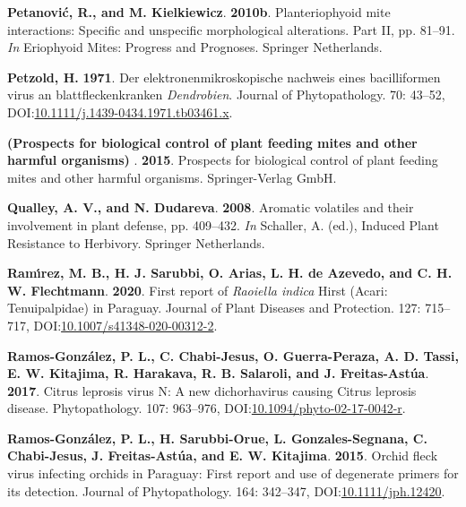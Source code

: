 \documentclass[12pt,final,CPage]{ufthesis}
\newlength{\cslhangindent}
\newenvironment{CSLReferences}[2] %
{%
	\setlength{\parindent}{0pt}
	\ifodd #1 \everypar{\setlength{\hangindent}{\cslhangindent}}\ignorespaces\fi
	\ifnum #2 > 0
	\setlength{\parskip}{#2\baselineskip}
	\fi
}%
{}
\begin{document}
{\begin{CSLReferences}{1}{0}
  \leavevmode{}%
  \textbf{Petanović, R., and M. Kielkiewicz}. \textbf{2010b}. Plant{\textendash}eriophyoid mite interactions: Specific and unspecific morphological alterations. Part {II}, pp. 81--91. \emph{In} Eriophyoid Mites: Progress and Prognoses. Springer Netherlands.

  \leavevmode{}%
  \textbf{Petzold, H.} \textbf{1971}. Der elektronenmikroskopische nachweis eines bacilliformen virus an blattfleckenkranken {\emph{Dendrobien}}. Journal of Phytopathology. 70: 43--52, DOI:\href{https://doi.org/10.1111/j.1439-0434.1971.tb03461.x}{10.1111/j.1439-0434.1971.tb03461.x}.

  \leavevmode{}%
  \textbf{(Prospects for biological control of plant feeding mites and other harmful organisms) }. \textbf{2015}. Prospects for biological control of plant feeding mites and other harmful organisms. Springer-Verlag GmbH.

  \leavevmode{}%
  \textbf{Qualley, A. V., and N. Dudareva}. \textbf{2008}. Aromatic volatiles and their involvement in plant defense, pp. 409--432. \emph{In} Schaller, A. (ed.), Induced Plant Resistance to Herbivory. Springer Netherlands.

  \leavevmode{}%
  \textbf{Ramı́rez, M. B., H. J. Sarubbi, O. Arias, L. H. de Azevedo, and C. H. W. Flechtmann}. \textbf{2020}. First report of {\emph{Raoiella indica}} {Hirst} ({Acari}: {Tenuipalpidae}) in {Paraguay}. Journal of Plant Diseases and Protection. 127: 715--717, DOI:\href{https://doi.org/10.1007/s41348-020-00312-2}{10.1007/s41348-020-00312-2}.

  \leavevmode{}%
  \textbf{Ramos-González, P. L., C. Chabi-Jesus, O. Guerra-Peraza, A. D. Tassi, E. W. Kitajima, R. Harakava, R. B. Salaroli, and J. Freitas-Astúa}. \textbf{2017}. {Citrus leprosis virus} {N}: A new dichorhavirus causing {Citrus leprosis} disease. Phytopathology{\textregistered}. 107: 963--976, DOI:\href{https://doi.org/10.1094/phyto-02-17-0042-r}{10.1094/phyto-02-17-0042-r}.

  \leavevmode{}%
  \textbf{Ramos-González, P. L., H. Sarubbi-Orue, L. Gonzales-Segnana, C. Chabi-Jesus, J. Freitas-Astúa, and E. W. Kitajima}. \textbf{2015}. {Orchid fleck virus} infecting orchids in {Paraguay}: First report and use of degenerate primers for its detection. Journal of Phytopathology. 164: 342--347, DOI:\href{https://doi.org/10.1111/jph.12420}{10.1111/jph.12420}.


\end{CSLReferences}}
\end{document}
